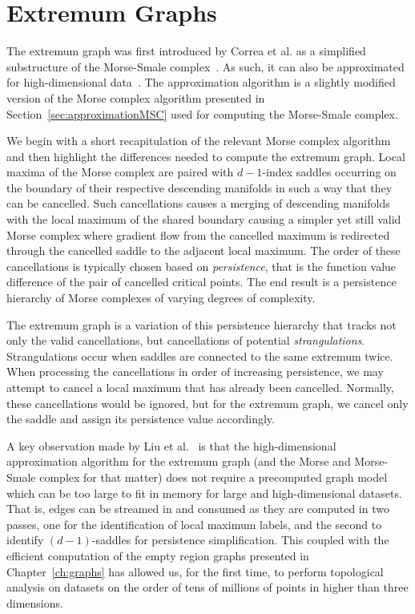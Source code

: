 \section{Extremum Graphs}
\label{sec:extremumGraph}

The extremum graph was first introduced by Correa et al. as a simplified substructure of the Morse-Smale complex~\cite{CorreaLindstromBremer2011}.
%
As such, it can also be approximated for high-dimensional data~\cite{CorreaLindstromBremer2011,ThomasNatarajan2013}.
%
The approximation algorithm is a slightly modified version of the Morse complex algorithm presented in Section~\ref{sec:approximationMSC} used for computing the Morse-Smale complex.

We begin with a short recapitulation of the relevant Morse complex algorithm and then highlight the differences needed to compute the extremum graph.
%
Local maxima of the Morse complex are paired with $d-1$-index saddles occurring on the boundary of their respective descending manifolds in such a way that they can be cancelled.
%
Such cancellations causes a merging of descending manifolds with the local maximum of the shared boundary causing a simpler yet still valid Morse complex where gradient flow from the cancelled maximum is redirected through the cancelled saddle to the adjacent local maximum.
%
The order of these cancellations is typically chosen based on \textit{persistence}, that is the function value difference of the pair of cancelled critical points.
%
The end result is a persistence hierarchy of Morse complexes of varying degrees of complexity.

The extremum graph is a variation of this persistence hierarchy that tracks not only the valid cancellations, but cancellations of potential \textit{strangulations}.
%
Strangulations occur when saddles are connected to the same extremum twice.
%
When processing the cancellations in order of increasing persistence, we may attempt to cancel a local maximum that has already been cancelled.
%
Normally, these cancellations would be ignored, but for the extremum graph, we cancel only the saddle and assign its persistence value accordingly.

A key observation made by Liu et al.~\cite{LiuWangMaljovec2019} is that the high-dimensional approximation algorithm for the extremum graph (and the Morse and Morse-Smale complex for that matter) does not require a precomputed graph model which can be too large to fit in memory for large and high-dimensional datasets.
%
That is, edges can be streamed in and consumed as they are computed in two passes, one for the identification of local maximum labels, and the second to identify $(d-1)$-saddles for persistence simplification.
%
This coupled with the efficient computation of the empty region graphs presented in Chapter~\ref{ch:graphs} has allowed us, for the first time, to perform topological analysis on datasets on the order of tens of millions of points in higher than three dimensions.

% 
